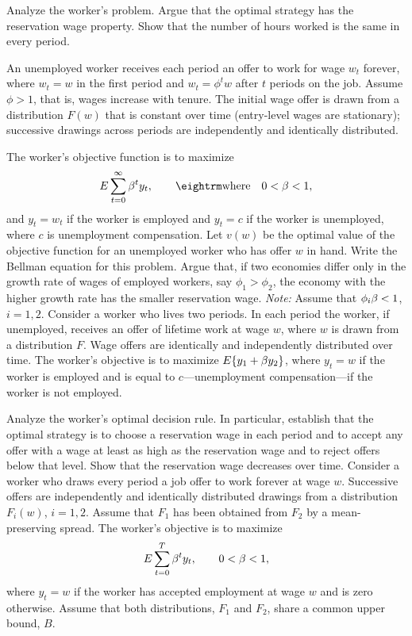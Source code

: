 Analyze the worker's problem.  Argue that the optimal strategy has the
reservation wage property. Show that the number of hours worked is the same in
every period.

\medskip
{}
\medskip
\noindent An unemployed worker receives each period an offer to work for wage $w_t$
forever, where $w_t=w$ in the first period and $w_t=\phi^tw$ after
 $t$ periods on
the job.  Assume $\phi>1$, that is, wages increase with tenure.  The initial
wage offer is drawn from a distribution $F(w)$ that is constant over time
(entry-level wages are stationary); successive drawings across periods are
independently and identically distributed.

The worker's objective function is to maximize
$$E\sum_{t=0}^\infty \be^t y_t,\qquad {\rm where}\quad 0<\be<1,$$
and $y_t=w_t$ if the worker is employed and $y_t=c$ if the worker is
unemployed, where $c$ is unemployment compensation.  Let $v(w)$ be the optimal
value of the objective function for an unemployed worker who has offer $w$ in
hand.  Write the Bellman equation for this problem.  Argue that, if two economies
differ only in the growth rate of wages of employed workers, say
$\phi_1>\phi_2$, the economy with the higher growth rate has the smaller
reservation wage.
{\it Note:} Assume that $\phi_i{\beta} <1$, $i=1,2$.
\medskip
{}
\medskip
\noindent Consider a worker who lives two periods.  In each period the worker, if
unemployed, receives an offer of lifetime work at wage $w$, where $w$ is drawn
from a distribution $F$.  Wage offers are identically and independently
distributed over time.  The worker's objective is to maximize $E\{y_1+{\beta}
y_2\}$, where $y_t=w$ if the worker is employed and is equal to
$c$---unemployment compensation---if the worker is not employed.

Analyze the worker's optimal decision rule.  In particular, establish that the
optimal strategy is to choose a reservation wage in each period and to accept
any offer with a wage at least as high as the reservation wage and to reject
offers below that level.  Show that the reservation wage decreases over time.
\medskip
{}
\medskip
\noindent Consider a worker who draws every period a job offer to work forever at wage
$w$.  Successive offers are independently and identically distributed drawings
from a distribution $F_i(w)$, $i=1,2$.  Assume that $F_1$ has been obtained
from $F_2$ by a mean-preserving spread.  The worker's
objective is to maximize
$$E \sum_{t=0}^T {\beta}^t y_t,\qquad 0<{\beta} <1,$$
where $y_t=w$ if the worker has accepted employment at wage $w$ and is zero
otherwise.  Assume that both distributions, $F_1$ and $F_2$, share a common
upper bound, $B$.

